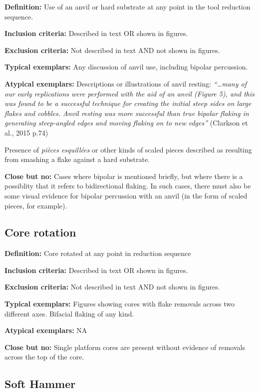 \documentclass[
]{article}
\begin{document}
\textbf{Definition:} Use of an anvil or hard substrate at any point in
the tool reduction sequence.

\textbf{Inclusion criteria:} Described in text OR shown in figures.

\textbf{Exclusion criteria:} Not described in text AND not shown in
figures.

\textbf{Typical exemplars:} Any discussion of anvil use, including
bipolar percussion.

\textbf{Atypical exemplars:} Descriptions or illustrations of anvil
resting: \emph{``\ldots many of our early replications were performed
with the aid of an anvil (Figure 5), and this was found to be a
successful technique for creating the initial steep sides on large
flakes and cobbles. Anvil resting was more successful than true bipolar
flaking in generating steep-angled edges and moving flaking on to new
edges''} (Clarkson et al., 2015 p.74)

Presence of \emph{pièces esquillées} or other kinds of scaled pieces
described as resulting from smashing a flake against a hard substrate.

\textbf{Close but no:} Cases where bipolar is mentioned briefly, but
where there is a possiblity that it refers to bidirectional flaking. In
such cases, there must also be some visual evidence for bipolar
percussion with an anvil (in the form of scaled pieces, for example).

\hypertarget{core-rotation}{%
\subsection{Core rotation}\label{core-rotation}}

\textbf{Definition:} Core rotated at any point in reduction sequence

\textbf{Inclusion criteria:} Described in text OR shown in figures.

\textbf{Exclusion criteria:} Not described in text AND not shown in
figures.

\textbf{Typical exemplars:} Figures showing cores with flake removals
across two different axes. Bifacial flaking of any kind.

\textbf{Atypical exemplars:} NA

\textbf{Close but no:} Single platform cores are present without
evidence of removals across the top of the core.

\hypertarget{soft-hammer}{%
\subsection{Soft Hammer}\label{soft-hammer}}
\end{document}
